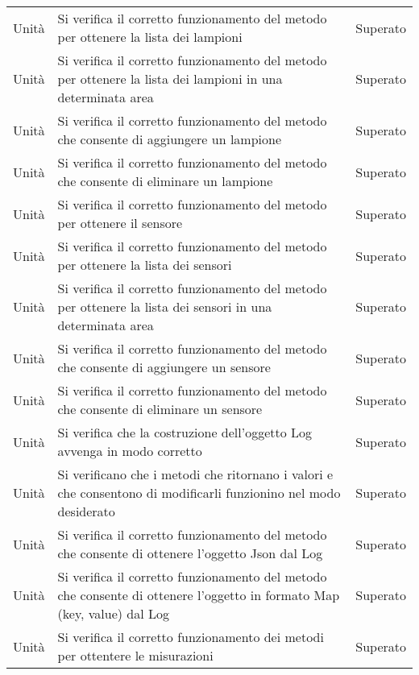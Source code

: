 \begin{center}
\begin{xltabular}{\linewidth}{|l|X|l|}
        Unità & Si verifica il corretto funzionamento del metodo per ottenere la lista dei lampioni & Superato\\
        Unità & Si verifica il corretto funzionamento del metodo per ottenere la lista dei lampioni in una determinata area & Superato\\
        Unità & Si verifica il corretto funzionamento del metodo che consente di aggiungere un lampione & Superato\\
        Unità & Si verifica il corretto funzionamento del metodo che consente di eliminare un lampione & Superato\\
        Unità & Si verifica il corretto funzionamento del metodo per ottenere il sensore & Superato\\
        Unità & Si verifica il corretto funzionamento del metodo per ottenere la lista dei sensori & Superato\\
        Unità & Si verifica il corretto funzionamento del metodo per ottenere la lista dei sensori in una determinata area & Superato\\
        Unità & Si verifica il corretto funzionamento del metodo che consente di aggiungere un sensore & Superato\\
        Unità & Si verifica il corretto funzionamento del metodo che consente di eliminare un sensore & Superato\\
        Unità & Si verifica che la costruzione dell'oggetto Log avvenga in modo corretto & Superato\\
        Unità & Si verificano che i metodi che ritornano i valori e che consentono di modificarli funzionino nel modo desiderato & Superato\\
        Unità & Si verifica il corretto funzionamento del metodo che consente di ottenere l'oggetto Json dal Log & Superato\\
        Unità & Si verifica il corretto funzionamento del metodo che consente di ottenere l'oggetto in formato Map (key, value) dal Log & Superato\\
        Unità & Si verifica il corretto funzionamento dei metodi per ottentere le misurazioni & Superato\\
        

\end{xltabular}
\end{center}
